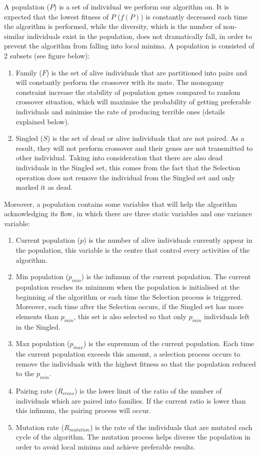 \documentclass[review]{elsarticle}
\begin{document}
A population ($P$) is a set of individual we perform our algorithm on. It is expected that the lowest fitness of $P$ ($f(P)$) is constantly decreased each time the algorithm is performed, while the diversity, which is the number of non-similar individuals exist in the population, does not dramatically fall, in order to prevent the algorithm from falling into local minima. A population is consisted of 2 subsets (see figure below):
\begin{enumerate}
	\item Family ($F$) is the set of alive individuals that are partitioned into pairs and will constantly perform the crossover with its mate. The monogamy constraint increase the stability of population genes compared to random crossover situation, which will maximise the probability of getting preferable individuals and minimise the rate of producing terrible ones (details explained below).
	\item Singled ($S$) is the set of dead or alive individuals that are not paired. As a result, they will not perform crossover and their genes are not transmitted to other individual. Taking into consideration that there are also dead individuals in the Singled set, this comes from the fact that the Selection operation does not remove the individual from the Singled set and only marked it as dead.
	
\end{enumerate}
Moreover, a population contains some variables that will help the algorithm acknowledging its flow, in which there are three static variables and one variance variable:
\begin{enumerate}
	\item Current population ($p$) is the number of alive individuals currently appear in the population, this variable is the centre that control every activities of the algorithm.
	\item Min population ($p_{min}$) is the infimum of the current population. The current population reaches its minimum when the population is initialised at the beginning of the algorithm or each time the Selection process is triggered. Moreover, each time after the Selection occurs, if the Singled set has more elements than $p_{min}$, this set is also selected so that only $p_{min}$ individuals left in the Singled.
	\item Max population ($p_{max}$) is the supremum of the current population. Each time the current population exceeds this amount, a selection process occurs to remove the individuals with the highest fitness so that the population reduced to the $p_{min}$.
	\item Pairing rate ($R_{cross}$) is the lower limit of the ratio of the number of individuals which are paired into families. If the current ratio is lower than this infimum, the pairing process will occur.
	\item Mutation rate ($R_{mutation}$) is the rate of the individuals that are mutated each cycle of the algorithm. The mutation process helps diverse the population in order to avoid local minima and achieve preferable results. 
\end{enumerate}
\end{document}
